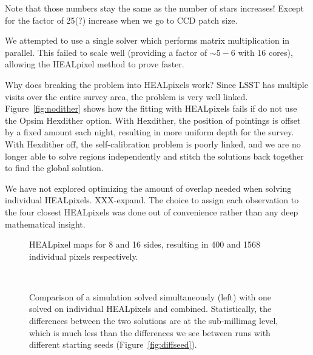 \documentclass[12pt,preprint]{aastex}
\begin{document}
Note that those numbers stay the same as the number of stars increases!  Except for the factor of 25(?) increase when we go to CCD patch size.


We attempted to use a single solver which performs matrix multiplication in parallel.  This failed to scale well (providing a factor of $\sim5-6$ with 16 cores), allowing the HEALpixel method to prove faster.

Why does breaking the problem into HEALpixels work?  Since LSST has multiple visits over the entire survey area, the problem is very well linked.  Figure~\ref{fig:nodither} shows how the fitting with HEALpixels fails if do not use the Opsim Hexdither option.  With Hexdither, the position of pointings is offset by a fixed amount each night, resulting in more uniform depth for the survey.  With Hexdither off, the self-calibration problem is poorly linked, and we are no longer able to solve regions independently and stitch the solutions back together to find the global solution.  

We have not explored optimizing the amount of overlap needed when solving individual HEALpixels.  XXX-expand.  The choice to assign each observation to the four closest HEALpixels was done out of convenience rather than any deep mathematical insight.  


\begin{figure}
\caption{HEALpixel maps for 8 and 16 sides, resulting in 400 and 1568 individual pixels respectively.}
\end{figure}


\begin{figure}
 \\
\caption{Comparison of a simulation solved simultaneously (left) with one solved on individual HEALpixels and combined.  Statistically, the differences between the two solutions are at the sub-millimag level, which is much less than the differences we see between runs with different starting seeds (Figure~\ref{fig:diffseed}). \label{fig:hpvglobal}}
\end{figure}
\end{document}
